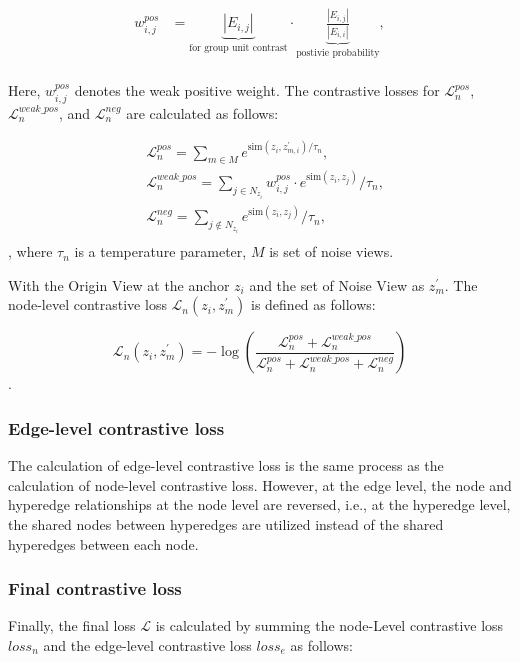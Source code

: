\begin{equation}
\begin{split}
    w_{i,j}^{pos} &= \underbrace{|E_{i,j}|}_{\text{for group unit contrast}} \cdot \underbrace{\frac{|E_{i,j}|}{|E_{i,i}|}}_{\text{postivie probability}}, \\
\end{split}
\end{equation}

Here, $w_{i,j}^{pos}$ denotes the weak positive weight. The contrastive losses for $\mathcal{L}_n^{pos}$, $\mathcal{L}_n^{weak\_pos}$, and $\mathcal{L}_n^{neg}$ are calculated as follows:

\begin{equation}
\begin{split}
&\mathcal{L}_n^{pos} = \sum_{m \in M} e^{\text{sim}(z_i, z_{m,i}^{\prime})/\tau_n}, \\
&\mathcal{L}_n^{weak\_pos} = \sum_{j \in N_{z_i}} w_{i,j}^{pos} \cdot e^{\text{sim}(z_i, z_j)}/{\tau_n}, \\
&\mathcal{L}_n^{neg} = \sum_{j \notin N_{z_i}} e^{\text{sim}(z_i, z_j)}/{\tau_n}, \\
\end{split}
\end{equation},
where $\tau_n$ is a temperature parameter, $M$ is set of noise views.

With the Origin View at the anchor $z_i$ and the set of Noise View as $z_{m}^{\prime}$. The node-level contrastive loss $\mathcal{L}_n(z_i, z_{m}^{\prime})$ is defined as follows:

\begin{equation}
    \mathcal{L}_n(z_i, z_{m}^{\prime}) = -\log \left( \frac{\mathcal{L}_n^{pos} + \mathcal{L}_n^{weak\_pos}}{\mathcal{L}_n^{pos} + \mathcal{L}_n^{weak\_pos} + \mathcal{L}_n^{neg}} \right)
\end{equation}
.

\subsubsection{Edge-level contrastive loss}


The calculation of edge-level contrastive loss is the same process as the calculation of node-level contrastive loss. However, at the edge level, the node and hyperedge relationships at the node level are reversed, i.e., at the hyperedge level, the shared nodes between hyperedges are utilized instead of the shared hyperedges between each node. 
\subsubsection{Final contrastive loss}
Finally, the final loss $\mathcal{L}$ is calculated by summing the node-Level contrastive loss $loss_n$ and the edge-level contrastive loss $loss_e$ as follows:


